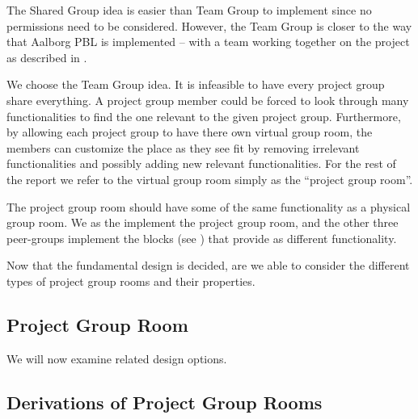The Shared Group idea is easier than Team Group to implement since no permissions need to be considered.
However, the Team Group is closer to the way that Aalborg PBL is implemented -- with a team working together on the project as described in .

We choose the Team Group idea. 
It is infeasible to have every project group share everything.
A project group member could be forced to look through many functionalities to find the one relevant to the given project group.
Furthermore, by allowing each project group to have there own virtual group room, the members can customize the place as they see fit by removing irrelevant functionalities and possibly adding new relevant functionalities.
For the rest of the report we refer to the virtual group room simply as the ``project group room''.

The project group room should have some of the same functionality as a physical group room.
We as the \groupname{} implement the project group room, and the other three peer-groups implement the blocks (see ) that provide as different functionality.

Now that the fundamental design is decided, are we able to consider the different types of project group rooms and their properties.

\subsection{Project Group Room}



We will now examine related design options.

\subsection{Derivations of Project Group Rooms}







